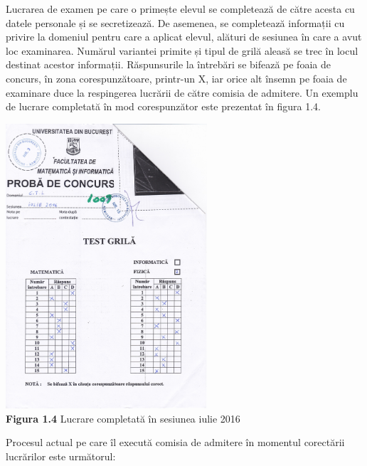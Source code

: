 \documentclass[a4paper,12pt]{report}
\newcommand\tab[1][1cm]{\hspace*{#1}}
\begin{document}
\tab Lucrarea de examen pe care o primește elevul se completează de către acesta cu datele personale și se secretizează. De asemenea, se completează informații cu privire la domeniul pentru care a aplicat elevul, alături de
sesiunea în care a avut loc examinarea. Numărul variantei primite și tipul de grilă aleasă se trec în locul destinat acestor informații. Răspunsurile la întrebări se bifează pe foaia de concurs, în zona corespunzătoare, printr-un X, iar orice alt însemn pe foaia
de examinare duce la respingerea lucrării de către comisia de admitere. Un exemplu de lucrare completată în mod corespunzător este prezentat în figura 1.4.
\begin {center} 
	\begin {footnotesize} 
		\includegraphics[width =75mm]{fig1_4} \\
		\textbf  {Figura 1.4} Lucrare completată în sesiunea iulie 2016
	\end {footnotesize} 
\end {center}
\tab Procesul actual pe care îl execută comisia de admitere în momentul corectării lucrărilor este următorul:
\end{document}
